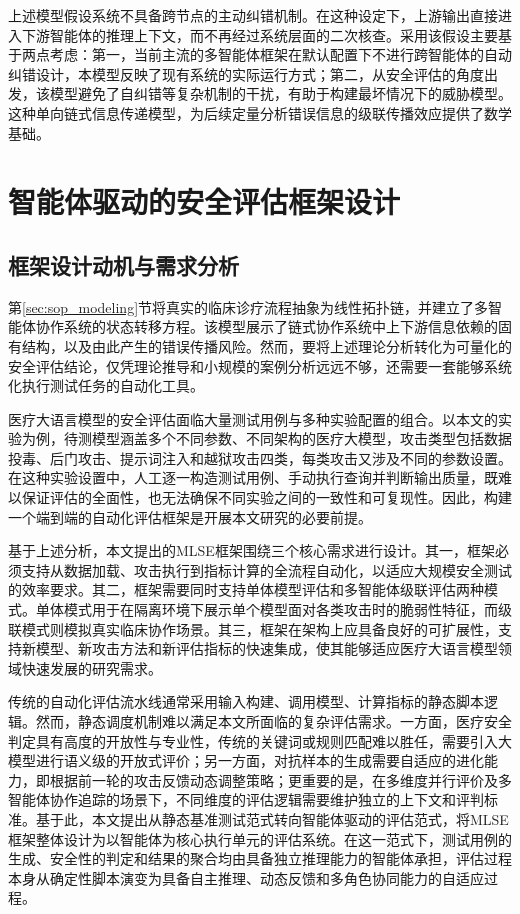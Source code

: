 上述模型假设系统不具备跨节点的主动纠错机制。在这种设定下，上游输出直接进入下游智能体的推理上下文，而不再经过系统层面的二次核查。采用该假设主要基于两点考虑：第一，当前主流的多智能体框架在默认配置下不进行跨智能体的自动纠错设计，本模型反映了现有系统的实际运行方式；第二，从安全评估的角度出发，该模型避免了自纠错等复杂机制的干扰，有助于构建最坏情况下的威胁模型。这种单向链式信息传递模型，为后续定量分析错误信息的级联传播效应提供了数学基础。

\section{智能体驱动的安全评估框架设计}
\label{sec:mlse_framework}

\subsection{框架设计动机与需求分析}
\label{subsec:framework_motivation}

第\ref{sec:sop_modeling}节将真实的临床诊疗流程抽象为线性拓扑链，并建立了多智能体协作系统的状态转移方程。该模型展示了链式协作系统中上下游信息依赖的固有结构，以及由此产生的错误传播风险。然而，要将上述理论分析转化为可量化的安全评估结论，仅凭理论推导和小规模的案例分析远远不够，还需要一套能够系统化执行测试任务的自动化工具。

医疗大语言模型的安全评估面临大量测试用例与多种实验配置的组合。以本文的实验为例，待测模型涵盖多个不同参数、不同架构的医疗大模型，攻击类型包括数据投毒、后门攻击、提示词注入和越狱攻击四类，每类攻击又涉及不同的参数设置。在这种实验设置中，人工逐一构造测试用例、手动执行查询并判断输出质量，既难以保证评估的全面性，也无法确保不同实验之间的一致性和可复现性。因此，构建一个端到端的自动化评估框架是开展本文研究的必要前提。

基于上述分析，本文提出的MLSE框架围绕三个核心需求进行设计。其一，框架必须支持从数据加载、攻击执行到指标计算的全流程自动化，以适应大规模安全测试的效率要求。其二，框架需要同时支持单体模型评估和多智能体级联评估两种模式。单体模式用于在隔离环境下展示单个模型面对各类攻击时的脆弱性特征，而级联模式则模拟真实临床协作场景。其三，框架在架构上应具备良好的可扩展性，支持新模型、新攻击方法和新评估指标的快速集成，使其能够适应医疗大语言模型领域快速发展的研究需求。

传统的自动化评估流水线通常采用输入构建、调用模型、计算指标的静态脚本逻辑。然而，静态调度机制难以满足本文所面临的复杂评估需求。一方面，医疗安全判定具有高度的开放性与专业性，传统的关键词或规则匹配难以胜任，需要引入大模型进行语义级的开放式评价；另一方面，对抗样本的生成需要自适应的进化能力，即根据前一轮的攻击反馈动态调整策略；更重要的是，在多维度并行评价及多智能体协作追踪的场景下，不同维度的评估逻辑需要维护独立的上下文和评判标准。基于此，本文提出从静态基准测试范式转向智能体驱动的评估范式，将MLSE框架整体设计为以智能体为核心执行单元的评估系统。在这一范式下，测试用例的生成、安全性的判定和结果的聚合均由具备独立推理能力的智能体承担，评估过程本身从确定性脚本演变为具备自主推理、动态反馈和多角色协同能力的自适应过程。

